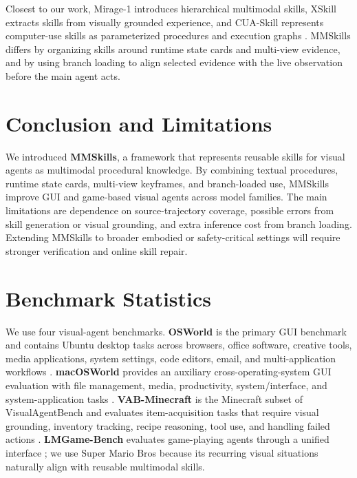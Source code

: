 \documentclass{llmxive}
\providecommand{\beginappendix}{\appendix{\huge\sffamily Appendix\par}}
\begin{document}
Closest to our work, Mirage-1 introduces hierarchical multimodal skills, XSkill extracts skills from visually grounded experience, and CUA-Skill represents computer-use skills as parameterized procedures and execution graphs \citep{xie2025mirage,jiang2026xskillcontinuallearningexperience,chen2026cuaskill}. MMSkills differs by organizing skills around runtime state cards and multi-view evidence, and by using branch loading to align selected evidence with the live observation before the main agent acts.


\section{Conclusion and Limitations}
\label{sec:conclusion}

We introduced \textbf{MMSkills}, a framework that represents reusable skills for visual agents as multimodal procedural knowledge. By combining textual procedures, runtime state cards, multi-view keyframes, and branch-loaded use, MMSkills improve GUI and game-based visual agents across model families. The main limitations are dependence on source-trajectory coverage, possible errors from skill generation or visual grounding, and extra inference cost from branch loading. Extending MMSkills to broader embodied or safety-critical settings will require stronger verification and online skill repair.






\beginappendix

\section{Benchmark Statistics}
\label{app:benchmark-statistics}

We use four visual-agent benchmarks. \textbf{OSWorld} is the primary GUI benchmark and contains Ubuntu desktop tasks across browsers, office software, creative tools, media applications, system settings, code editors, email, and multi-application workflows \citep{xie2024osworld}. \textbf{macOSWorld} provides an auxiliary cross-operating-system GUI evaluation with file management, media, productivity, system/interface, and system-application tasks \citep{yang2025macosworld}. \textbf{VAB-Minecraft} is the Minecraft subset of VisualAgentBench and evaluates item-acquisition tasks that require visual grounding, inventory tracking, recipe reasoning, tool use, and handling failed actions \citep{liu2024visualagentbench}. \textbf{LMGame-Bench} evaluates game-playing agents through a unified interface \citep{hu2025lmgamebenchgoodllmsplaying}; we use Super Mario Bros because its recurring visual situations naturally align with reusable multimodal skills.
\end{document}
